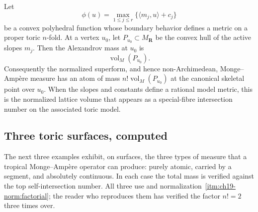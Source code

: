 \begin{example}
\label{ex:ch19-toric-polyhedral}
Let
\[
                  \phi(u)=\max_{1\leq j\leq r}
                              \{\langle m_j,u\rangle+c_j\}
\]
be a convex polyhedral function whose boundary behavior defines a metric on
a proper toric $n$-fold.  At a vertex $u_0$, let
$P_{u_0}\subset M_{\mathbf R}$ be the convex hull of the active slopes
$m_j$.  Then the Alexandrov mass at $u_0$ is
\[
                            \operatorname{vol}_M(P_{u_0}).
\]
Consequently the normalized superform, and hence non-Archimedean,
Monge--Amp\`ere measure has an atom of mass
$n!\operatorname{vol}_M(P_{u_0})$ at the canonical skeletal point over
$u_0$.  When the slopes and constants define a rational model metric,
this is the normalized lattice volume that
appears as a special-fibre intersection number on the associated toric
model.
\end{example}

\subsection{Three toric surfaces, computed}
\label{sec:ch19-toric-worked}

The next three examples exhibit, on surfaces, the three types of measure
that a tropical Monge--Amp\`ere operator can produce: purely atomic, carried
by a segment, and absolutely continuous.  In each case the total mass is
verified against the top self-intersection number.  All three use
 and
normalization~\cref{itm:ch19-norm:factorial}; the reader who reproduces them
has verified the factor $n!=2$ three times over.

